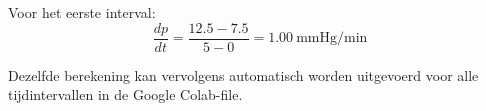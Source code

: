 \documentclass{ximera}
\begin{document}
\begin{question}
\begin{enumerate}
\begin{feedback}
    Voor het eerste interval:
    \[
    \frac{dp}{dt}
    =
    \frac{12.5-7.5}{5-0}
    =
    1.00\ \text{mmHg/min}
    \]
    \end{feedback}
\end{enumerate}

Dezelfde berekening kan vervolgens automatisch worden uitgevoerd voor alle
tijdintervallen in de Google Colab-file.

\end{question}
\end{document}
